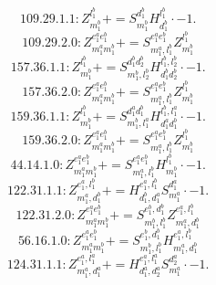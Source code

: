 \documentclass[letterpaper,10pt,fleqn,leqno,onecolumn]{article}
\begin{document}
\begin{equation} \;\;\;\;\;\;  109.29.1.1: Z^{l_{1}^{b}}_{m_{1}^{b}}+=S^{d_{1}^{b}}_{m_{1}^{b}}H^{l_{1}^{b}}_{d_{1}^{b}}\cdot -1. \end{equation}
\begin{equation} \;\;\;\;\;\;  109.29.2.0: Z^{e_{1}^{a}e_{1}^{b}}_{m_{1}^{a}m_{1}^{b}}+=S^{e_{1}^{a}e_{1}^{b}}_{m_{1}^{a},l_{1}^{b}}Z^{l_{1}^{b}}_{m_{1}^{b}} \end{equation}
\begin{equation} \;\;\;\;\;\;  157.36.1.1: Z^{l_{1}^{b}}_{m_{1}^{b}}+=S^{d_{1}^{b}d_{2}^{b}}_{m_{1}^{b},l_{2}^{b}}H^{l_{1}^{b},l_{2}^{b}}_{d_{1}^{b}d_{2}^{b}}\cdot -1. \end{equation}
\begin{equation} \;\;\;\;\;\;  157.36.2.0: Z^{e_{1}^{a}e_{1}^{b}}_{m_{1}^{a}m_{1}^{b}}+=S^{e_{1}^{a}e_{1}^{b}}_{m_{1}^{a},l_{1}^{b}}Z^{l_{1}^{b}}_{m_{1}^{b}} \end{equation}
\begin{equation} \;\;\;\;\;\;  159.36.1.1: Z^{l_{1}^{b}}_{m_{1}^{b}}+=S^{d_{1}^{a}d_{1}^{b}}_{m_{1}^{b},l_{1}^{a}}H^{l_{1}^{b},l_{1}^{a}}_{d_{1}^{a}d_{1}^{b}}\cdot -1. \end{equation}
\begin{equation} \;\;\;\;\;\;  159.36.2.0: Z^{e_{1}^{a}e_{1}^{b}}_{m_{1}^{a}m_{1}^{b}}+=S^{e_{1}^{a}e_{1}^{b}}_{m_{1}^{a},l_{1}^{b}}Z^{l_{1}^{b}}_{m_{1}^{b}} \end{equation}
\begin{equation} \;\;\;\;\;\;  44.14.1.0: Z^{e_{1}^{a}e_{1}^{b}}_{m_{1}^{a}m_{1}^{b}}+=S^{e_{1}^{a}e_{1}^{b}}_{m_{1}^{a},l_{1}^{b}}H^{l_{1}^{b}}_{m_{1}^{b}}\cdot -1. \end{equation}
\begin{equation} \;\;\;\;\;\;  122.31.1.1: Z^{e_{1}^{a},l_{1}^{b}}_{m_{1}^{a},d_{1}^{b}}+=H^{e_{1}^{a},l_{1}^{b}}_{d_{1}^{b},d_{1}^{a}}S^{d_{1}^{a}}_{m_{1}^{a}}\cdot -1. \end{equation}
\begin{equation} \;\;\;\;\;\;  122.31.2.0: Z^{e_{1}^{a}e_{1}^{b}}_{m_{1}^{a}m_{1}^{b}}+=S^{e_{1}^{b},d_{1}^{b}}_{m_{1}^{b},l_{1}^{b}}Z^{e_{1}^{a},l_{1}^{b}}_{m_{1}^{a},d_{1}^{b}} \end{equation}
\begin{equation} \;\;\;\;\;\;  56.16.1.0: Z^{e_{1}^{a}e_{1}^{b}}_{m_{1}^{a}m_{1}^{b}}+=S^{e_{1}^{b},d_{1}^{b}}_{m_{1}^{b},l_{1}^{b}}H^{e_{1}^{a},l_{1}^{b}}_{m_{1}^{a},d_{1}^{b}} \end{equation}
\begin{equation} \;\;\;\;\;\;  124.31.1.1: Z^{e_{1}^{a},l_{1}^{a}}_{m_{1}^{a},d_{1}^{a}}+=H^{e_{1}^{a},l_{1}^{a}}_{d_{1}^{a},d_{2}^{a}}S^{d_{2}^{a}}_{m_{1}^{a}}\cdot -1. \end{equation}
\end{document}
